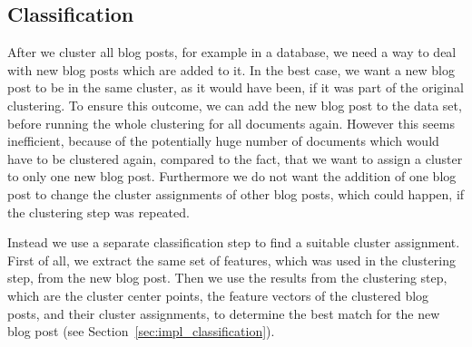 
\subsection{Classification}
\label{sec:classification}


After we cluster all blog posts, for example in a database, we need a way to deal with new blog posts which are added to it.
In the best case, we want a new blog post to be in the same cluster, as it would have been, if it was part of the original clustering.
To ensure this outcome, we can add the new blog post to the data set, before running the whole clustering for all documents again.
However this seems inefficient, because of the potentially huge number of documents which would have to be clustered again, compared to the fact, that we want to assign a cluster to only one new blog post.
Furthermore we do not want the addition of one blog post to change the cluster assignments of other blog posts, which could happen, if the clustering step was repeated.


Instead we use a separate classification step to find a suitable cluster assignment.
First of all, we extract the same set of features, which was used in the clustering step, from the new blog post.
Then we use the results from the clustering step, which are the cluster center points, the feature vectors of the clustered blog posts, and their cluster assignments, to determine the best match for the new blog post (see Section~\ref{sec:impl_classification}).